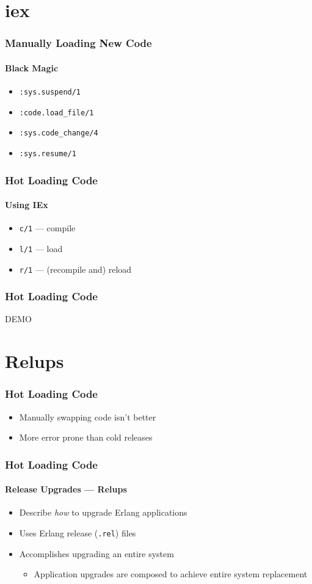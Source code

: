 \documentclass{beamer}
\begin{document}
\section{iex}

\begin{frame}
\frametitle{Manually Loading New Code}
\framesubtitle{Black Magic}
\begin{itemize}
\item{\texttt{:sys.suspend/1}}
\item{\texttt{:code.load\_file/1}}
\item{\texttt{:sys.code\_change/4}}
\item{\texttt{:sys.resume/1}}
\end{itemize}
\end{frame}

\begin{frame}
\frametitle{Hot Loading Code}
\framesubtitle{Using IEx}
\begin{itemize}
\item{\texttt{c/1} --- compile}
\item{\texttt{l/1} --- load}
\item{\texttt{r/1} --- (recompile and) reload}
\end{itemize}
\end{frame}

\begin{frame}
\frametitle{Hot Loading Code}
\Huge{DEMO}
\end{frame}

\section{Relups}

\begin{frame}
\frametitle{Hot Loading Code}
\begin{itemize}
\item{Manually swapping code isn't better}
\item{More error prone than cold releases}
\end{itemize}
\end{frame}

\begin{frame}
\frametitle{Hot Loading Code}
\framesubtitle{Release Upgrades --- Relups}
\begin{itemize}
\item{Describe \textit{how} to upgrade Erlang applications}
\item{Uses Erlang release (\texttt{.rel}) files}
\item{Accomplishes upgrading an entire system}
\begin{itemize}
\item{Application upgrades are composed to achieve entire system replacement}
\end{itemize}
\end{itemize}
\end{frame}
\end{document}
